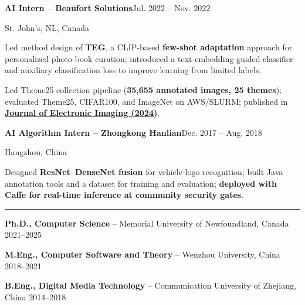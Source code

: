 \documentclass[11pt,letterpaper]{article}
\newcommand{\cvsection}[1]{\par\addvspace{6pt}{\large\bfseries #1}\par\vspace{1pt}\hrule\vspace{3pt}}
\newcommand{\role}[3]{\par\addvspace{4pt}\textbf{#1}\hfill{\small #2}\par{\small\color{muted}#3}\par}
\newenvironment{points}{\begin{list}{\textbullet}{\setlength{\leftmargin}{12pt}\setlength{\itemsep}{1.2pt}\setlength{\parsep}{0pt}\setlength{\topsep}{1.5pt}\setlength{\partopsep}{0pt}}}{\end{list}}
\begin{document}
\role{AI Intern -- Beaufort Solutions}{Jul. 2022 -- Nov. 2022}{St. John's, NL, Canada}
\begin{points}
\item Led method design of \textbf{TEG}, a CLIP-based \textbf{few-shot adaptation} approach for personalized photo-book curation; introduced a text-embedding-guided classifier and auxiliary classification loss to improve learning from limited labels.
\item Led Theme25 collection pipeline (\textbf{35,655 annotated images, 25 themes}); evaluated Theme25, CIFAR100, and ImageNet on AWS/SLURM; published in \href{https://doi.org/10.1117/1.JEI.33.1.013028}{\textbf{Journal of Electronic Imaging (2024)}}.
\end{points}
\role{AI Algorithm Intern -- Zhongkong Hanlian}{Dec. 2017 -- Aug. 2018}{Hangzhou, China}
\begin{points}
\item Designed \textbf{ResNet--DenseNet fusion} for vehicle-logo recognition; built Java annotation tools and a dataset for training and evaluation; \textbf{deployed with Caffe for real-time inference at community security gates}.
\end{points}

\newpage
\cvsection{Education}
\textbf{Ph.D., Computer Science} -- Memorial University of Newfoundland, Canada \hfill 2021--2025\par
\textbf{M.Eng., Computer Software and Theory} -- Wenzhou University, China \hfill 2018--2021\par
\textbf{B.Eng., Digital Media Technology} -- Communication University of Zhejiang, China \hfill 2014--2018
\end{document}
